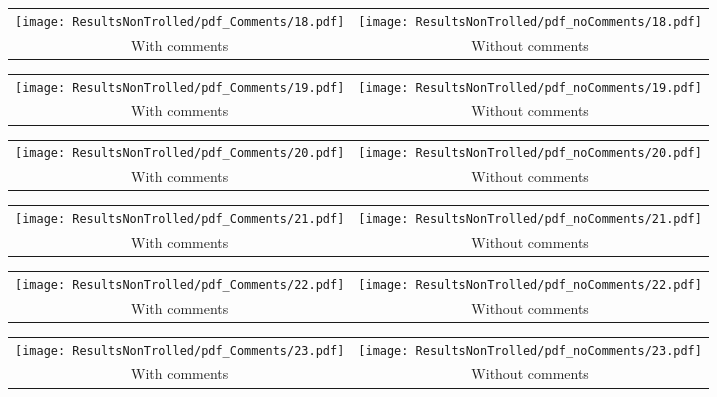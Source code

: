 \begin{tabular}{cc}
{  \texttt{[image: ResultsNonTrolled/pdf\_Comments/18.pdf]} } & 
{  \texttt{[image: ResultsNonTrolled/pdf\_noComments/18.pdf]}} \\
 With comments & Without comments \\
\end{tabular}

\begin{tabular}{cc}
{  \texttt{[image: ResultsNonTrolled/pdf\_Comments/19.pdf]} } & 
{  \texttt{[image: ResultsNonTrolled/pdf\_noComments/19.pdf]}} \\
 With comments & Without comments \\
\end{tabular}

\begin{tabular}{cc}
{  \texttt{[image: ResultsNonTrolled/pdf\_Comments/20.pdf]} } & 
{  \texttt{[image: ResultsNonTrolled/pdf\_noComments/20.pdf]}} \\
 With comments & Without comments \\
\end{tabular}

\begin{tabular}{cc}
{  \texttt{[image: ResultsNonTrolled/pdf\_Comments/21.pdf]} } & 
{  \texttt{[image: ResultsNonTrolled/pdf\_noComments/21.pdf]}} \\
 With comments & Without comments \\
\end{tabular}

\begin{tabular}{cc}
{  \texttt{[image: ResultsNonTrolled/pdf\_Comments/22.pdf]} } & 
{  \texttt{[image: ResultsNonTrolled/pdf\_noComments/22.pdf]}} \\
 With comments & Without comments \\
\end{tabular}

\begin{tabular}{cc}
{  \texttt{[image: ResultsNonTrolled/pdf\_Comments/23.pdf]} } & 
{  \texttt{[image: ResultsNonTrolled/pdf\_noComments/23.pdf]}} \\
 With comments & Without comments \\
\end{tabular}


